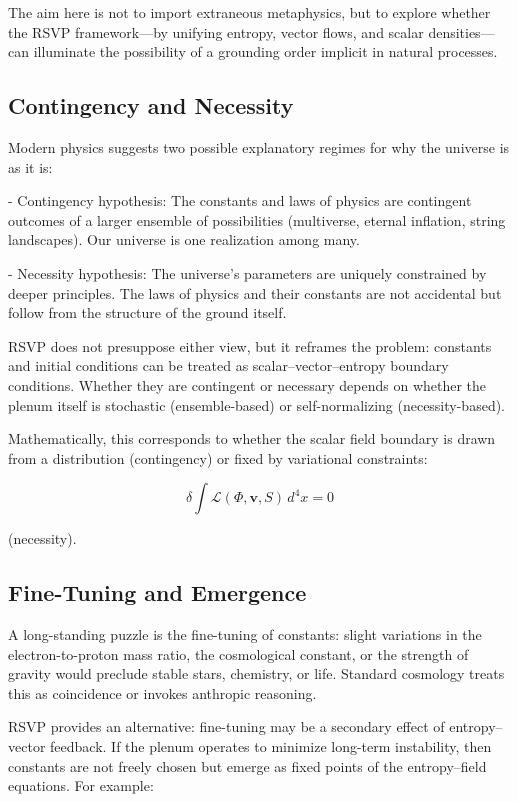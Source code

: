 \documentclass[12pt]{book}
\begin{document}
The aim here is not to import extraneous metaphysics, but to explore whether the RSVP framework—by unifying entropy, vector flows, and scalar densities—can illuminate the possibility of a grounding order implicit in natural processes.

\subsection{Contingency and Necessity}
Modern physics suggests two possible explanatory regimes for why the universe is as it is:

- Contingency hypothesis: The constants and laws of physics are contingent outcomes of a larger ensemble of possibilities (multiverse, eternal inflation, string landscapes). Our universe is one realization among many.

- Necessity hypothesis: The universe’s parameters are uniquely constrained by deeper principles. The laws of physics and their constants are not accidental but follow from the structure of the ground itself.

RSVP does not presuppose either view, but it reframes the problem: constants and initial conditions can be treated as scalar–vector–entropy boundary conditions. Whether they are contingent or necessary depends on whether the plenum itself is stochastic (ensemble-based) or self-normalizing (necessity-based).

Mathematically, this corresponds to whether the scalar field boundary is drawn from a distribution (contingency) or fixed by variational constraints:

\[ \delta \int \mathcal{L}(\Phi, \mathbf{v}, S) \, d^4x = 0 \]

(necessity).

\subsection{Fine-Tuning and Emergence}
A long-standing puzzle is the fine-tuning of constants: slight variations in the electron-to-proton mass ratio, the cosmological constant, or the strength of gravity would preclude stable stars, chemistry, or life. Standard cosmology treats this as coincidence or invokes anthropic reasoning.

RSVP provides an alternative: fine-tuning may be a secondary effect of entropy–vector feedback. If the plenum operates to minimize long-term instability, then constants are not freely chosen but emerge as fixed points of the entropy–field equations. For example:
\end{document}
